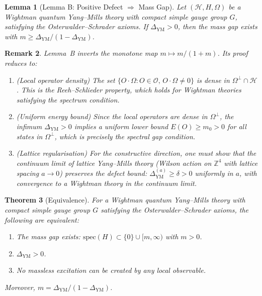 \documentclass[11pt]{article}
\newtheorem{theorem}{Theorem}[section]
\newtheorem{lemma}[theorem]{Lemma}
\newtheorem{remark}[theorem]{Remark}
\begin{document}
\begin{lemma}[Lemma B: Positive Defect $\Rightarrow$ Mass Gap]
\label{lem:ym-B}
Let $(\mathcal{H}, H, \Omega)$ be a Wightman quantum Yang--Mills theory with compact simple gauge group $G$, satisfying the Osterwalder--Schrader axioms. If $\Delta_{\mathrm{YM}} > 0$, then the mass gap exists with $m \geq \Delta_{\mathrm{YM}} / (1 - \Delta_{\mathrm{YM}})$.
\end{lemma}

\begin{remark}
Lemma~B inverts the monotone map $m \mapsto m/(1+m)$. Its proof reduces to:
\begin{enumerate}
  \item[\textbf{B.1}] \emph{(Local operator density)} The set $\{O \cdot \Omega : O \in \mathcal{O},\, O \cdot \Omega \neq 0\}$ is dense in $\Omega^\perp \cap \mathcal{H}$. This is the Reeh--Schlieder property, which holds for Wightman theories satisfying the spectrum condition.
  \item[\textbf{B.2}] \emph{(Uniform energy bound)} Since the local operators are dense in $\Omega^\perp$, the infimum $\Delta_{\mathrm{YM}} > 0$ implies a uniform lower bound $E(O) \geq m_0 > 0$ for \emph{all} states in $\Omega^\perp$, which is precisely the spectral gap condition.
  \item[\textbf{B.3}] \emph{(Lattice regularisation)} For the constructive direction, one must show that the continuum limit of lattice Yang--Mills theory (Wilson action on $\mathbb{Z}^4$ with lattice spacing $a \to 0$) preserves the defect bound: $\Delta_{\mathrm{YM}}^{(a)} \geq \delta > 0$ uniformly in $a$, with convergence to a Wightman theory in the continuum limit.
\end{enumerate}
\end{remark}

\begin{theorem}[Equivalence]
\label{thm:ym-equiv}
For a Wightman quantum Yang--Mills theory with compact simple gauge group $G$ satisfying the Osterwalder--Schrader axioms, the following are equivalent:
\begin{enumerate}
  \item[(i)] The mass gap exists: $\mathrm{spec}(H) \subset \{0\} \cup [m, \infty)$ with $m > 0$.
  \item[(ii)] $\Delta_{\mathrm{YM}} > 0$.
  \item[(iii)] No massless excitation can be created by any local observable.
\end{enumerate}
Moreover, $m = \Delta_{\mathrm{YM}} / (1 - \Delta_{\mathrm{YM}})$.
\end{theorem}
\end{document}
